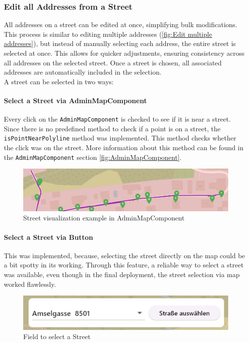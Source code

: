\subsubsection{Edit all Addresses from a Street}
All addresses on a street can be edited at once, simplifying bulk modifications. This process is similar to editing multiple addresses (\ref{fig:Edit multiple addresses}), but instead of manually selecting each address, the entire street is selected at once. This allows for quicker adjustments, ensuring consistency across all addresses on the selected street. Once a street is chosen, all associated addresses are automatically included in the selection. \\

A street can be selected in two ways:  




\paragraph{Select a Street via AdminMapComponent}
Every click on the \texttt{AdminMapComponent} is checked to see if it is near a street. Since there is no predefined method to check if a point is on a street, the \texttt{isPointNearPolyline} method was implemented. This method checks whether the click was on the street. More information about this method can be found in the \texttt{AdminMapComponent} section \ref{fig:AdminMapComponent}.\

\begin{figure}[H]
    \centering
    \includegraphics[width=0.6\linewidth]{images/AdminPanel/Street.png}
    \caption{Street visualization example in AdminMapComponent}
\end{figure}


\paragraph{Select a Street via Button}
This was implemented, because, selecting the street directly on the map could be a bit spotty in its working. Through this feature, a reliable way to select a street was available, even though in the final deployment, the street selection via map worked flawlessly. 
\begin{figure}[H]
    \centering
    \includegraphics[width=0.6\linewidth]{images/AdminPanel/SelectStreetButton.png}
    \caption{Field to select a Street}
\end{figure}

